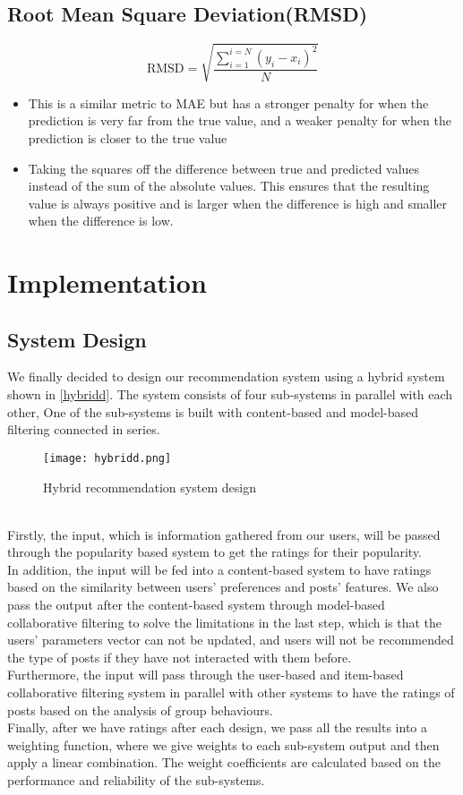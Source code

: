\subsection{Root Mean Square Deviation(RMSD)}
\begin{equation*}
\text{RMSD} = \sqrt{\frac{\sum^{i=N}_{i=1}(y_{i} - x_{i})^{2}}{N}}
\end{equation*}

\begin{itemize}
\item This is a similar metric to MAE but has a stronger penalty for when the prediction is very far from the true value, and a weaker penalty for when the prediction is closer to the true value
\item Taking the squares off the difference between true and predicted values instead of the sum of the absolute values. This ensures that the resulting value is always positive and is larger when the difference is high and smaller when the difference is low.
\end{itemize}


\section{Implementation}
\subsection{System Design}
We finally decided to design our recommendation system using a hybrid system shown in \autoref{hybridd}. The system consists of four sub-systems in parallel with each other, 
One of the sub-systems is built with content-based and model-based filtering connected in series.
\begin{figure}[ht]
    \centering
    \texttt{[image: hybridd.png]}
    \caption{Hybrid recommendation system design}
    \label{hybridd}
    \end{figure}
\\Firstly, the input, which is information gathered from our users, will be passed through the popularity based system to get the ratings for their popularity.
\\In addition, the input will be fed into a content-based system to have ratings based on the similarity between users' preferences and posts' features. 
We also pass the output after the content-based system through model-based collaborative filtering to solve the limitations in the last step, 
which is that the users' parameters vector can not be updated, and users will not be recommended the type of posts if they have not interacted with them before. 
\\Furthermore, the input will pass through the user-based and item-based collaborative filtering system in parallel with other systems 
to have the ratings of posts based on the analysis of group behaviours.
\\Finally, after we have ratings after each design, we pass all the results into a weighting function, where we give weights to each sub-system output and then apply a linear combination.
The weight coefficients are calculated based on the performance and reliability of the sub-systems.


